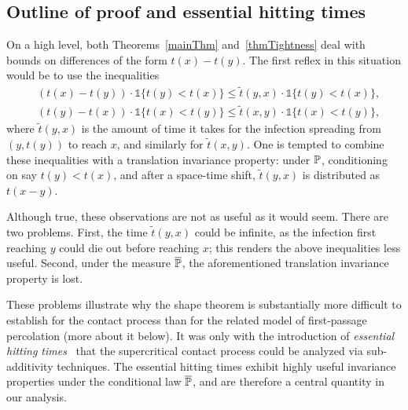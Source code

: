 \subsection{Outline of proof and essential hitting times}
\label{essHitSec}
On a high level, both Theorems~\ref{mainThm} and~\ref{thmTightness} deal with bounds on differences of the form $t(x) - t(y)$. The first reflex in this situation would be to use the inequalities
\begin{align*}&(t(x) - t(y)) \cdot \mathds{1}\{t(y)<t(x)\}  \leq \tilde t(y,x) \cdot \mathds{1}\{t(y)<t(x)\},\\ &(t(y) - t(x)) \cdot \mathds{1}\{t(x)<t(y)\}  \leq \tilde t(x,y) \cdot \mathds{1}\{t(x)<t(y)\},\end{align*}
where $\tilde t(y,x)$ is the amount of time it takes for the infection spreading from $(y,t(y))$ to reach $x$, and similarly for $\tilde t(x,y)$. One is tempted to combine these inequalities with a translation invariance property: under $\P$, conditioning on say $t(y) < t(x)$, and after a space-time shift, $\tilde t(y,x)$ is distributed as $t(x-y)$.

Although true, these observations are not as useful as it would seem. There are two problems. First, the time $\tilde t(y,x)$ could be infinite, as the infection first reaching $y$ could die out before reaching $x$; this renders the above inequalities less useful. Second, under the measure $\oP$, the aforementioned translation invariance property is lost.


These problems illustrate why the shape theorem is substantially more difficult to establish for the contact process than for the related model of first-passage percolation (more about it below). It was only with the 
introduction of 
\emph{essential hitting times}~\cite{GaretMarch12} that the supercritical contact process could be analyzed via
sub-additivity techniques. 
The essential hitting times exhibit highly useful invariance properties under the conditional law $\oP$, and are therefore a central quantity in our analysis.

